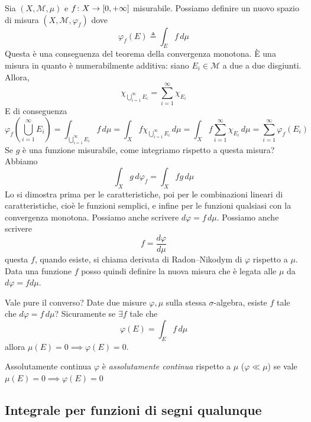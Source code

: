 \documentclass[a4paper]{article}
\begin{document}
\begin{radioactive}
Sia \((X,\mathcal M,\mu)\)
e \(f \colon X \to [0,+\infty]\) misurabile. Possiamo definire un nuovo spazio di misura
\((X, \mathcal M, \varphi_f)\) dove \[
    \varphi_f(E) \triangleq \int_E f\,d\mu
\]
Questa è una conseguenza del teorema della convergenza monotona.
È una misura in quanto è numerabilmente additiva:
siano \(E_i \in \mathcal M\) a due a due disgiunti. Allora,
\[
    \chi_{\bigcup_{i=1}^\infty E_i} = \sum_{i=1}^\infty \chi_{E_i}
\]
E di conseguenza
\[
    \varphi_f\left(
        \bigcup_{i=1}^\infty E_i
    \right)
    = \int_{\bigcup_{i=1}^\infty E_i} f\,d\mu
    = \int_X f \chi_{\bigcup_{i=1}^\infty E_i}\,d\mu =
    \int_X f \sum_{i=1}^\infty \chi_{E_i} \,d\mu
    = \sum_{i=1}^\infty \varphi_f(E_i)
\]
Se \(g\) è una funzione misurabile, come integriamo rispetto a questa misura?
Abbiamo
\[
    \int_X g\,d\varphi_f = \int_X fg\,d\mu
\]
Lo si dimostra prima per le caratteristiche, poi per le combinazioni lineari di caratteristiche,
cioè le funzioni semplici, e infine per le funzioni qualsiasi con la convergenza monotona.
Possiamo anche scrivere \(d\varphi = f\,d\mu\). Possiamo anche scrivere
\[
    f = \frac{d\varphi}{d\mu}
\]
questa \(f\), quando esiste, si chiama derivata di Radon--Nikodym di \(\varphi\) rispetto a \(\mu\).
Data una funzione \(f\) posso quindi definire la nuova misura
che è legata alle \(\mu\) da \(d\varphi = fd\mu\).
\end{radioactive}

\begin{radioactive}
Vale pure il converso? Date due misure \(\varphi, \mu\) sulla stessa \(\sigma\)-algebra,
esiste \(f\) tale che \(d\varphi = f\,d\mu\)?
Sicuramente se \(\exists f\) tale che \[
    \varphi(E) = \int_E f\,d\mu
\]
allora \(\mu(E) = 0 \implies \varphi(E) = 0\).
\end{radioactive}

\begin{radioactive}
\begin{snippetdefinition}{Assolutamente continua}
    \(\varphi\) è \emph{assolutamente continua} rispetto a \(\mu\) (\(\varphi \ll \mu\))
    se vale \(\mu(E) = 0 \implies \varphi(E) = 0\)
\end{snippetdefinition}
\end{radioactive}

\subsection{Integrale per funzioni di segni qualunque}
\end{document}
